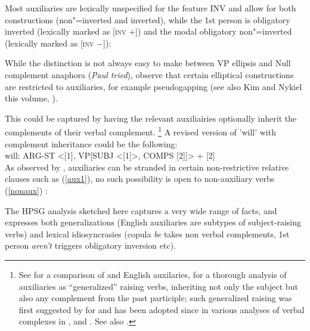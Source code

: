 \documentclass[output=paper
	        ,collection
	        ,collectionchapter
 	        ,biblatex
                ,babelshorthands
                ,newtxmath
                ,draftmode
                ,colorlinks, citecolor=brown
]{langscibook}
\begin{document}
Most auxiliaries are lexically unspecified for the feature INV and allow for both constructions (non"=inverted and inverted), while the 1st person  is obligatory inverted (lexically marked as [\textsc{inv} $+$]) and the modal  obligatory non"=inverted (lexically marked as [\textsc{inv} $-$]):

\eal
{}
\zl

While the distinction is not always easy to make between VP ellipsis and Null complement anaphora (\textit{Paul tried}), \citeauthor{Sagetal2020} observe that certain elliptical constructions are restricted to auxiliaries, for example pseudogapping (see also  Kim and Nykiel this volume, \citep{Miller2014a-u}).

\eal
{}
\zl

This could be captured by having the relevant auxiliairies optionally inherit the complements of their verbal complement. 
\footnote{See  for a comparison of  and English auxilaries,  for a thorough analysis of  auxiliaries as ``generalized'' raising verbs, inheriting not only the subject but also any complement from the past participle; such generalized raising was first suggested by \citet{HN89a,HN94a} for  and has been adopted since in various analyses of verbal complexes in  \citep{Kiss95a,Meurers2000b,Kathol2001a,Mueller99a,Mueller2002b},  \citep{BvN98a} and  \citep[Section~4]{MuellerPersian}. See also .}
A revised version of 'will' with complement inheritance could be the following:
\\
will: ARG-ST <[1], VP[SUBJ <[1]>, COMPS [2]]> + [2]
\\
As observed by \citet{ArnoldandBorsley2008}, auxiliaries can be stranded in certain non-restrictive relative clauses such as (\ref{aux1}), no such possibility is open to non-auxiliary verbs (\ref{nonaux}) :

\eal
{}
\zl

The HPSG analysis sketched here captures a very wide range of facts, and expresses both generalizations (English auxiliaries are subtypes of subject-raising verbs) and lexical idiosyncrasies (copula \emph{be} takes non verbal complements, 1st person \emph{aren't} triggers obligatory inversion etc).
\end{document}
